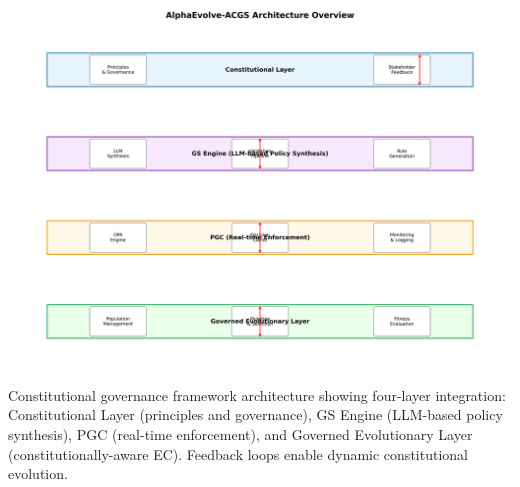 \documentclass[sigconf]{acmart} %
\begin{document}


\maketitle %

\begin{teaserfigure}
  \centering
  \includegraphics[width=\textwidth,height=0.35\textheight,keepaspectratio]{architecture_overview.png}
  \caption{Constitutional governance framework architecture showing four-layer integration: Constitutional Layer (principles and governance), GS Engine (LLM-based policy synthesis), PGC (real-time enforcement), and Governed Evolutionary Layer (constitutionally-aware EC). Feedback loops enable dynamic constitutional evolution.}
  \label{fig:teaser-architecture}
\end{teaserfigure}
\end{document}
